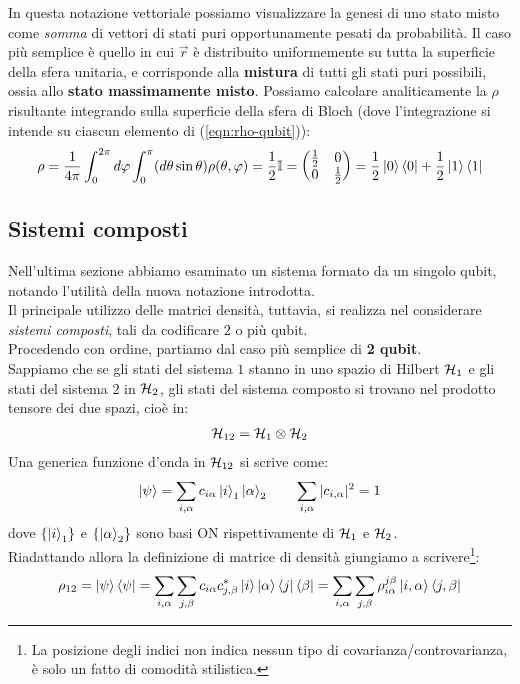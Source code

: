 \documentclass[../../InformazioneQuantistica.tex]{subfiles}
\begin{document}
In questa notazione vettoriale possiamo visualizzare la genesi di uno stato misto come \textit{somma} di vettori di stati puri opportunamente pesati da probabilità. Il caso più semplice è quello in cui $\vec{r}$ è distribuito uniformemente su tutta la superficie della sfera unitaria, e corrisponde alla \textbf{mistura} di tutti gli stati puri possibili, ossia allo \textbf{stato massimamente misto}. Possiamo calcolare analiticamente la $\rho$ risultante integrando sulla superficie della sfera di Bloch (dove l'integrazione si intende su ciascun elemento di (\ref{eqn:rho-qubit})):
\begin{align*}
\rho = \frac{1}{4\pi}\int_0^{2\pi} d\varphi \int_0^\pi (d\theta \sin\theta) \rho(\theta,\varphi) = \frac{1}{2}\mathbb{I} = \begin{pmatrix}
\frac{1}{2} & 0 \\ 0 & \frac{1}{2}\end{pmatrix} = \frac{1}{2}\Ket{0}\Bra{0} + \frac{1}{2}\Ket{1}\Bra{1}
\end{align*}

\subsection{Sistemi composti}
Nell'ultima sezione abbiamo esaminato un sistema formato da un singolo qubit, notando l'utilità della nuova notazione introdotta.\\
Il principale utilizzo delle matrici densità, tuttavia, si realizza nel considerare \textit{sistemi composti}, tali da codificare $2$ o più qubit.\\
Procedendo con ordine, partiamo dal caso più semplice di \textbf{2 qubit}.\\
Sappiamo che se gli stati del sistema $1$ stanno in uno spazio di Hilbert $\mathcal{H}_1$ e gli stati del sistema $2$ in $\mathcal{H}_2$, gli stati del sistema composto si trovano nel prodotto tensore dei due spazi, cioè in:
\begin{align*}
\mathcal{H}_{12} = \mathcal{H}_1 \otimes \mathcal{H}_2
\end{align*}
Una generica funzione d'onda in $\mathcal{H}_{12}$ si scrive come:
\begin{align*}
\Ket{\psi} = \sum_{i,\alpha} c_{i\alpha} \Ket{i}_1\Ket{\alpha}_2 \qquad \sum_{i,\alpha} |c_{i,\alpha}|^2 = 1
\end{align*}
dove $\{\Ket{i}_1\}$ e $\{\Ket{\alpha}_2\}$ sono basi ON rispettivamente di $\mathcal{H}_1$ e $\mathcal{H}_2$.\\

Riadattando allora la definizione di matrice di densità giungiamo a scrivere\footnote{La posizione degli indici non indica nessun tipo di covarianza/controvarianza, è solo un fatto di comodità stilistica.}:
\begin{align}
\rho_{12} = \Ket{\psi}\Bra{\psi} = \sum_{i,\alpha}\sum_{j,\beta}c_{i\alpha}c^*_{j,\beta} \Ket{i}\Ket{\alpha}\Bra{j}\Bra{\beta} = \sum_{i,\alpha}\sum_{j,\beta} \rho_{i\alpha}^{j\beta} \Ket{i,\alpha}\Bra{j,\beta}
\label{eqn:rho-composta}
\end{align}
\end{document}
